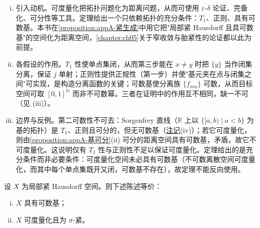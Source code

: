 \documentclass[../main.tex]{subfiles}
\begin{document}
\begin{remark}\label{remark:appA-Urysohn度量化}
\begin{enumerate}[(i)]
\item 引入动机。可度量化把拓扑问题化为距离问题，从而可使用 $\varepsilon$-$\delta$ 论证、完备化、可分性等工具。定理给出一个只依赖拓扑的充分条件：$T_1$、正则、具有可数基。本书在\cref{proposition:appA-紧生成}中用它把"局部紧 Hausdorff 且具可数基"的空间化为距离空间，\cref{chapter:ch05}关于窄收敛与胎紧性的论证都以此为前提。
\item 各假设的作用。$T_1$ 性使单点集闭，从而第三步能在 $x\neq y$ 时把 $\{y\}$ 当作闭集分离，保证 $j$ 单射；正则性提供正规性（第一步）并使"基元夹在点与闭集之间"可实现，是构造分离函数的关键；可数基使分离族 $\{f_{mn}\}$ 可数，从而目标空间可取 $[0,1]^{\mathbb{N}}$ 而非不可数幂。三者在证明中的作用互不相同，缺一不可（见 (iii)）。
\item 边界与反例。第二可数性不可去：Sorgenfrey 直线（$\mathbb{R}$ 上以 $\{[a,b)\mid a<b\}$ 为基的拓扑）是 $T_1$、正则且可分的，但无可数基（\hyperref[remark:appA-可分]{注记}(iv)）；若它可度量化，则由\cref{proposition:appA-基可分}(ii) 可分的距离空间具有可数基，矛盾，故它不可度量化。这说明仅有 $T_1$ 性与正则性不足以保证可度量化。定理给出的是充分条件而非必要条件：可度量化空间未必具有可数基（不可数离散空间可度量化，而其中每个单点集既开又闭，可数基不存在），故定理不能反向使用。
\end{enumerate}
\end{remark}

\begin{proposition}\label{proposition:appA-紧生成}\label{proposition:appA-局部紧基}\label{proposition:appA-σ紧}\label{proposition:appA-可度量化}
设 $X$ 为局部紧 Hausdorff 空间。则下述陈述等价：
\begin{enumerate}[(i)]
\item $X$ 具有可数基；
\item $X$ 可度量化且为 $\sigma$-紧。
\end{enumerate}
\end{proposition}
\end{document}

